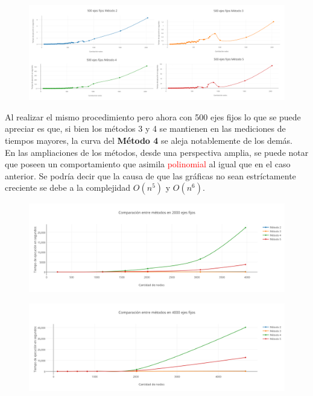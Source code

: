    \begin{figure}[h!]
   \begin{center}
 	\includegraphics[scale=0.08]{imagenes/local/tiempos/500ejes2.png}
   \end{center}
 \end{figure}

Al realizar el mismo procedimiento pero ahora con 500 ejes fijos lo que se puede apreciar es que, si bien los m\'etodos 3 y 4 se mantienen en las mediciones de tiempos mayores, la curva del \textbf{M\'etodo 4} se aleja notablemente de los dem\'as.\\

En las ampliaciones de los m\'etodos, desde una perspectiva amplia, se puede notar que poseen un comportamiento que asimila \textcolor{red}{polinomial} al igual que en el caso anterior. Se podr\'ia decir que la causa de que las gr\'aficas no sean estr\'ictamente creciente se debe a la complejidad $O(n^5)$ y $O(n^6)$.

\newpage

   \begin{figure}[h!]
   \begin{center}
 	\includegraphics[scale=0.55]{imagenes/local/tiempos/2000ejes.png}
   \end{center}
 \end{figure}
 
  \begin{figure}[h!]
   \begin{center}
 	\includegraphics[scale=0.55]{imagenes/local/tiempos/4000ejes.png}
   \end{center}
 \end{figure}
  
